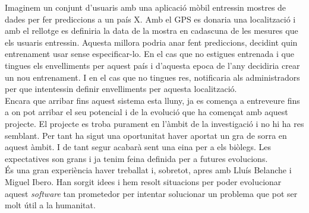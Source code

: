 Imaginem un conjunt d'usuaris amb una aplicació mòbil entressin mostres de dades per fer prediccions a un país X. Amb el GPS es donaria una localització i amb el rellotge es definiria la data de la mostra en cadascuna de les mesures que els usuaris entressin. Aquesta millora podria anar fent prediccions, decidint quin entrenament usar sense especificar-lo. En el cas que no estigues entrenada i que tingues els envelliments per aquest país i d'aquesta epoca de l'any decidiria crear un nou entrenament. I en el cas que no tingues res, notificaria als administradors per que intentessin definir envelliments per aquesta localització.\\

Encara que arribar fins aquest sistema esta lluny, ja es comença a entreveure fins a on pot arribar el seu potencial i de la evolució que ha començat amb aquest projecte. El projecte es troba purament en l'àmbit de la investigació i no hi ha res semblant. Per tant ha sigut una oportunitat haver aportat un gra de sorra en aquest àmbit. I de tant segur acabar\`{a} sent una eina per a els biòlegs. Les expectatives son grans i ja tenim feina definida per a futures evolucions.\\

\'{E}s una gran experiència haver treballat i, sobretot, apres amb Lluís Belanche i Miguel Ibero. Han sorgit idees i hem resolt situacions per poder evolucionar aquest \textit{software} tan prometedor per intentar solucionar un problema que pot ser molt útil a la humanitat.